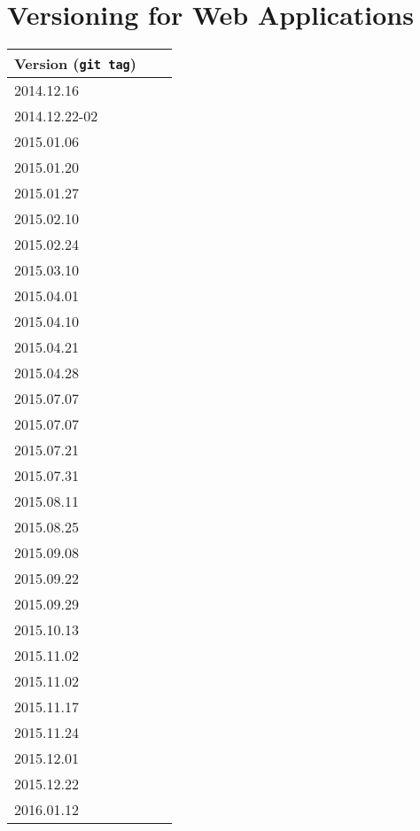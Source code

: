 
\chapter{Versioning for Web Applications} %

\label{AppendixA} %


\begin{table}[h!]
\parbox{.5\linewidth}{
\centering
\begin{tabular}{l*{1}{l}r}
\hline
Version (\texttt{git tag}) \\
\hline
2014.12.16      \\
2014.12.22-02   \\
2015.01.06      \\
2015.01.20      \\
2015.01.27      \\
2015.02.10      \\
2015.02.24      \\
2015.03.10      \\
2015.04.01      \\
2015.04.10      \\
2015.04.21      \\
2015.04.28      \\
2015.07.07      \\
2015.07.07      \\
2015.07.21      \\
2015.07.31      \\
2015.08.11      \\
2015.08.25      \\
2015.09.08      \\
2015.09.22      \\
2015.09.29      \\
2015.10.13      \\
2015.11.02      \\
2015.11.02      \\
2015.11.17      \\
2015.11.24      \\
2015.12.01      \\
2015.12.22      \\
2016.01.12 \\


\end{tabular}}
\end{table}
